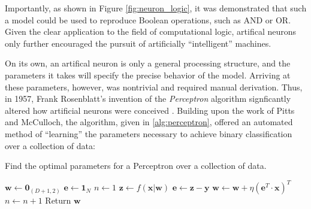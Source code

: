 \noindent Importantly, as shown in Figure \ref{fig:neuron_logic}, it was demonstrated that such a model could be used to reproduce Boolean operations, such as AND or OR.
Given the clear application to the field of computational logic, artifical neurons only further encouraged the pursuit of artificially ``intelligent'' machines.

On its own, an artifical neuron is only a general processing structure, and the parameters it takes will specify the precise behavior of the model.
Arriving at these parameters, however, was nontrivial and required manual derivation.
Thus, in 1957, Frank Rosenblatt's invention of the \emph{Perceptron} algorithm signficantly altered how artificial neurons were conceived \cite{Rosenblatt1957}.
Building upon the work of Pitts and McCulloch, the algorithm, given in \ref{alg:perceptron}, offered an automated method of ``learning'' the parameters necessary to achieve binary classification over a collection of data:

\begin{algorithm}[H]
\caption{Find the optimal parameters for a Perceptron over a collection of data.}
\label{alg:perceptron}
\small
\begin{algorithmic}[1]
    \State $\mathbf{w} \gets \mathbf{0}_{(D + 1, 2)}$
    \State $\mathbf{e} \gets \mathbf{1}_{N}$
    \State $n \gets 1$
        \State $\mathbf{z} \gets f(\mathbf{x} | \mathbf{w})$
        \State $\mathbf{e} \gets \mathbf{z} - \mathbf{y}$
        \State $\mathbf{w} \gets \mathbf{w} + \eta (\mathbf{e}^T \cdot \mathbf{x})^T$
        \State $n \gets n + 1$
    \EndWhile
    \State Return $\mathbf{w}$
\EndProcedure
\end{algorithmic}
\end{algorithm}

